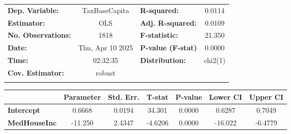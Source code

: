 \begin{center}
\begin{tabular}{lclc}
\toprule
\textbf{Dep. Variable:}    &   TaxBaseCapita    & \textbf{  R-squared:         } &      0.0114      \\
\textbf{Estimator:}        &        OLS         & \textbf{  Adj. R-squared:    } &      0.0109      \\
\textbf{No. Observations:} &        1818        & \textbf{  F-statistic:       } &      21.350      \\
\textbf{Date:}             &  Thu, Apr 10 2025  & \textbf{  P-value (F-stat)   } &      0.0000      \\
\textbf{Time:}             &      02:32:35      & \textbf{  Distribution:      } &     chi2(1)      \\
\textbf{Cov. Estimator:}   &       robust       & \textbf{                     } &                  \\
\textbf{}                  &                    & \textbf{                     } &                  \\
\bottomrule
\end{tabular}
\begin{tabular}{lcccccc}
                     & \textbf{Parameter} & \textbf{Std. Err.} & \textbf{T-stat} & \textbf{P-value} & \textbf{Lower CI} & \textbf{Upper CI}  \\
\midrule
\textbf{Intercept}   &       0.6668       &       0.0194       &      34.301     &      0.0000      &       0.6287      &       0.7049       \\
\textbf{MedHouseInc} &      -11.250       &       2.4347       &     -4.6206     &      0.0000      &      -16.022      &      -6.4779       \\
\bottomrule
\end{tabular}
\end{center}